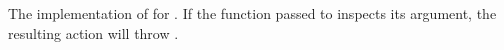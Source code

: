 \begin{haddockdesc}
\item[\begin{tabular}{@{}l}
instance MonadFail IO\\\end{tabular}]
\end{haddockdesc}
\begin{haddockdesc}
\item[\begin{tabular}{@{}l}
fixIO :: (a -> IO a) -> IO a
\end{tabular}]
{\haddockbegindoc
The implementation of  for . If the function
 passed to  inspects its argument, the resulting action will throw
 .\par}
\end{haddockdesc}
